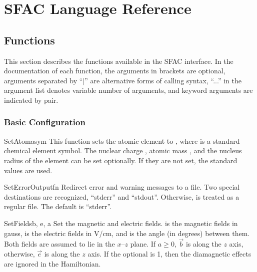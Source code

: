 \chapter{SFAC Language Reference}
\label{cha:function}

\section{Functions}
\label{sec:fac}

This section describes the functions available in the SFAC interface. In the
documentation of each function, the arguments in brackets are optional,
arguments separated by ``$\mid$'' are alternative forms of calling syntax,
``...'' in the argument list denotes variable number of arguments, and keyword
arguments are indicated by  pair.

\subsection{Basic Configuration}

\begin{fundesc}{SetAtom}{asym}
This function sets the atomic element to , where  is a
standard chemical element symbol. The nuclear charge , atomic mass
, and the nucleus radius of the element can be set optionally. If they
are not set, the standard values are used.
\end{fundesc}

\begin{fundesc}{SetErrorOutput}{fn}
Redirect error and warning messages to a file. Two special destinations are
recognized, ``stderr'' and ``stdout''. Otherwise,  is treated as a
regular file. The default is ``stderr''.
\end{fundesc}

\begin{fundesc}{SetFields}{b, e, a}
Set the magnetic and electric fields.  is the magnetic fields in gauss,
 is the electric fields in V/cm, and  is the angle (in degrees)
between them. Both fields are assumed to lie in the $x$--$z$ plane. If $a \ge
0$, $\vec{b}$ is along the $z$ axis, otherwise, $\vec{e}$ is along the $z$ axis.
If the optional  is 1, then the diamagnetic effects are ignored in the
Hamiltonian.
\end{fundesc}

